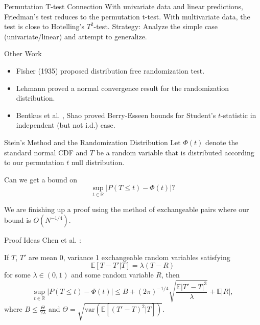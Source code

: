 \documentclass{beamer}
\newcommand{\var}{\mathrm{var}}
\newcommand{\E}{\mathbb{E}}
\begin{document}
\begin{frame}{Permutation T-test Connection}
  With univariate data and linear predictions, Friedman's test reduces
  to the permutation t-test.  \pause
  \newline
  \newline 
  With multivariate data, the test is close to Hotelling's
  $T^2$-test. \pause
  \newline
  \newline 
  Strategy: Analyze the simple case (univariate/linear) and attempt to
  generalize. 
\end{frame}

\begin{frame}{Other Work}
  \begin{itemize}
  \item Fisher (1935) \cite{fisher1935design} proposed distribution
    free randomization test.  \pause
  \item Lehmann \cite{lehmann1999elements} proved a normal convergence
    result for the randomization distribution. \pause
  \item Bentkus et al. \cite{bentkus1996berry}, Shao
    \cite{shao2005explicit} proved Berry-Esseen bounds for
    Student's $t$-statistic in independent (but not i.d.) case. 
  \end{itemize}
\end{frame}

\begin{frame}{Stein's Method and the Randomization Distribution}
  Let $\Phi(t)$ denote the standard normal CDF and $T$ be a random
  variable that is distributed according to our permutation $t$ null
  distribution. 

  Can we get a bound on
  \begin{equation*}
    \sup_{t \in \mathbb{R}} |P(T \leq t) - \Phi(t)|?
  \end{equation*}
  \pause

  We are finishing up a proof using the method of exchangeable pairs
  where our bound is $O(N^{-1/4})$.
\end{frame}

\begin{frame}{Proof Ideas}
  Chen et al. \cite{chen2010normal}:
  \begin{theorem}
    If $T$, $T'$ are mean 0, variance 1 exchangeable random variables
    satisfying
    \begin{equation*}
      \E[T-T'|T] = \lambda(T-R)    
    \end{equation*}
    for some $\lambda \in (0,1)$ and some random variable $R$, then 
    \begin{equation*}
      \sup_{t \in \mathbb{R}} |P(T \leq t) - \Phi(t)| \leq B +
      (2\pi)^{-1/4}\sqrt{\frac{\E|T'-T|^3}{\lambda}} + \E|R|,
    \end{equation*}
    where $B \leq \frac{\Theta}{2\lambda}$ and $\Theta =
    \sqrt{\var(\E[(T'-T)^2|T])}$. 
  \end{theorem}
\end{frame}
\end{document}
